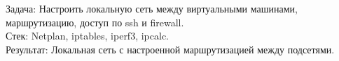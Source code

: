 \item {}
    Задача: Настроить локальную сеть между виртуальными машинами, маршрутизацию, доступ по ssh и firewall.\\
    Стек: Netplan, iptables, iperf3, ipcalc.\\
    Результат: Локальная сеть с настроенной маршрутизацией между подсетями.
